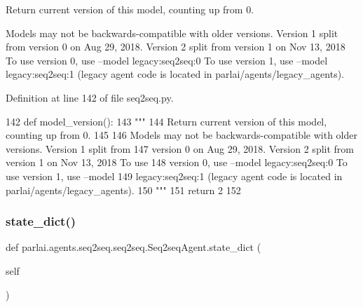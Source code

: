 \begin{DoxyVerb}Return current version of this model, counting up from 0.

Models may not be backwards-compatible with older versions. Version 1 split from
version 0 on Aug 29, 2018. Version 2 split from version 1 on Nov 13, 2018 To use
version 0, use --model legacy:seq2seq:0 To use version 1, use --model
legacy:seq2seq:1 (legacy agent code is located in parlai/agents/legacy_agents).
\end{DoxyVerb}
 

Definition at line 142 of file seq2seq.\+py.


\begin{DoxyCode}
142     \textcolor{keyword}{def }model\_version():
143         \textcolor{stringliteral}{"""}
144 \textcolor{stringliteral}{        Return current version of this model, counting up from 0.}
145 \textcolor{stringliteral}{}
146 \textcolor{stringliteral}{        Models may not be backwards-compatible with older versions. Version 1 split from}
147 \textcolor{stringliteral}{        version 0 on Aug 29, 2018. Version 2 split from version 1 on Nov 13, 2018 To use}
148 \textcolor{stringliteral}{        version 0, use --model legacy:seq2seq:0 To use version 1, use --model}
149 \textcolor{stringliteral}{        legacy:seq2seq:1 (legacy agent code is located in parlai/agents/legacy\_agents).}
150 \textcolor{stringliteral}{        """}
151         \textcolor{keywordflow}{return} 2
152 
\end{DoxyCode}
\mbox{\label{classparlai_1_1agents_1_1seq2seq_1_1seq2seq_1_1Seq2seqAgent_a7b68df3db0fcadb70a97a28ec2617cb2}} 
\subsubsection{\texorpdfstring{state\+\_\+dict()}{state\_dict()}}
{\footnotesize\ttfamily def parlai.\+agents.\+seq2seq.\+seq2seq.\+Seq2seq\+Agent.\+state\+\_\+dict (\begin{DoxyParamCaption}\item[{}]{self }\end{DoxyParamCaption})}

